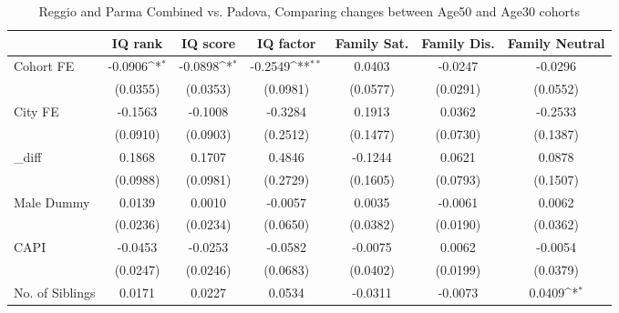 \begin{table}[htbp]\centering
\def\sym#1{\ifmmode^{#1}\else\(^{#1}\)\fi}
\caption{Reggio and Parma Combined vs. Padova, Comparing changes between Age50 and Age30 cohorts}
\begin{tabular}{l*{6}{c}}
\toprule
            &\multicolumn{1}{c}{IQ rank}&\multicolumn{1}{c}{IQ score}&\multicolumn{1}{c}{IQ factor}&\multicolumn{1}{c}{Family Sat.}&\multicolumn{1}{c}{Family Dis.}&\multicolumn{1}{c}{Family Neutral}\\
\midrule
Cohort FE   &     -0.0906\sym{*}  &     -0.0898\sym{*}  &     -0.2549\sym{**} &      0.0403         &     -0.0247         &     -0.0296         \\
            &    (0.0355)         &    (0.0353)         &    (0.0981)         &    (0.0577)         &    (0.0291)         &    (0.0552)         \\
\addlinespace
City FE     &     -0.1563         &     -0.1008         &     -0.3284         &      0.1913         &      0.0362         &     -0.2533         \\
            &    (0.0910)         &    (0.0903)         &    (0.2512)         &    (0.1477)         &    (0.0730)         &    (0.1387)         \\
\addlinespace
\_diff       &      0.1868         &      0.1707         &      0.4846         &     -0.1244         &      0.0621         &      0.0878         \\
            &    (0.0988)         &    (0.0981)         &    (0.2729)         &    (0.1605)         &    (0.0793)         &    (0.1507)         \\
\addlinespace
Male Dummy  &      0.0139         &      0.0010         &     -0.0057         &      0.0035         &     -0.0061         &      0.0062         \\
            &    (0.0236)         &    (0.0234)         &    (0.0650)         &    (0.0382)         &    (0.0190)         &    (0.0362)         \\
\addlinespace
CAPI        &     -0.0453         &     -0.0253         &     -0.0582         &     -0.0075         &      0.0062         &     -0.0054         \\
            &    (0.0247)         &    (0.0246)         &    (0.0683)         &    (0.0402)         &    (0.0199)         &    (0.0379)         \\
\addlinespace
No. of Siblings&      0.0171         &      0.0227         &      0.0534         &     -0.0311         &     -0.0073         &      0.0409\sym{*}  \\

\end{tabular}
\end{table}
